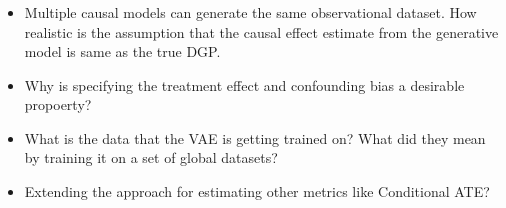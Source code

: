 \documentclass{beamer}
\begin{document}
\begin{frame}
	\frametitle{}
	\begin{itemize}
		\item Multiple causal models can generate the same
			observational dataset. How realistic is the assumption
			that the causal effect estimate from the generative
			model is same as the true DGP.
		\item Why is specifying the treatment effect and confounding
			bias a desirable propoerty?
		\item What is the data that the VAE is getting trained on? What
			did they mean by training it on a set of global
			datasets?
		\item Extending the approach for estimating other metrics like
			Conditional ATE?
	\end{itemize}
\end{frame}
\end{document}
